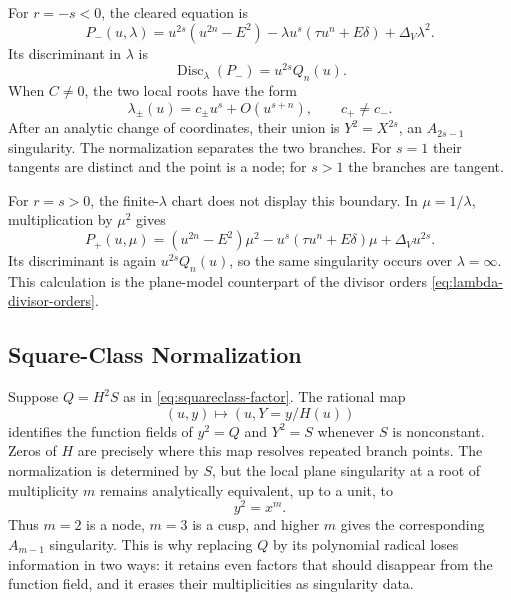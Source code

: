 \documentclass[11pt,reqno]{amsart}
\theoremstyle{remark}
\begin{document}
For $r=-s<0$, the cleared equation is
\begin{equation}\label{eq:app-negative-closure-repeat}
 P_-(u,\lambda)=u^{2s}(u^{2n}-E^2)
 -\lambda u^s(\tau u^n+E\delta)
 +\Delta_V\lambda^2.
\end{equation}
Its discriminant in $\lambda$ is
\begin{equation}\label{eq:app-negative-discriminant}
 \operatorname{Disc}_\lambda(P_-)=u^{2s}Q_n(u).
\end{equation}
When $C\ne0$, the two local roots have the form
\begin{equation}\label{eq:app-negative-branches}
 \lambda_\pm(u)=c_\pm u^s+O(u^{s+n}),
 \qquad c_+\ne c_-.
\end{equation}
After an analytic change of coordinates, their union is
$Y^2=X^{2s}$, an $A_{2s-1}$ singularity.  The normalization separates the
two branches.  For $s=1$ their tangents are distinct and the point is a node;
for $s>1$ the branches are tangent.

For $r=s>0$, the finite-$\lambda$ chart does not display this boundary.  In
$\mu=1/\lambda$, multiplication by $\mu^2$ gives
\begin{equation}\label{eq:app-positive-closure-repeat}
 P_+(u,\mu)=(u^{2n}-E^2)\mu^2
 -u^s(\tau u^n+E\delta)\mu
 +\Delta_Vu^{2s}.
\end{equation}
Its discriminant is again $u^{2s}Q_n(u)$, so the same singularity occurs over
$\lambda=\infty$.  This calculation is the plane-model counterpart of the
divisor orders \eqref{eq:lambda-divisor-orders}.

\subsection{Square-Class Normalization}

Suppose $Q=H^2S$ as in \eqref{eq:squareclass-factor}.  The rational map
\begin{equation}\label{eq:app-squareclass-map}
 (u,y)\longmapsto (u,Y=y/H(u))
\end{equation}
identifies the function fields of $y^2=Q$ and $Y^2=S$ whenever $S$ is
nonconstant.  Zeros of $H$ are precisely where this map resolves repeated
branch points.  The normalization is determined by $S$, but the local plane
singularity at a root of multiplicity $m$ remains analytically equivalent,
up to a unit, to
\begin{equation}\label{eq:app-local-multiplicity}
 y^2=x^m.
\end{equation}
Thus $m=2$ is a node, $m=3$ is a cusp, and higher $m$ gives the corresponding
$A_{m-1}$ singularity.  This is why replacing $Q$ by its polynomial radical
loses information in two ways: it retains even factors that should disappear
from the function field, and it erases their multiplicities as singularity
data.
\end{document}
